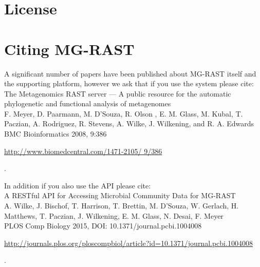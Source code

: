 \documentclass[12pt,fullpage]{report}
\begin{document}
\section{License}
\label{section:LICENSE}
{ \small

}
\section{Citing MG-RAST}
\label{section:MG-RAST-citation}

A significant number of papers have been published about MG-RAST itself and the supporting platform, however we ask that if you use the system please cite: \\
\noindent
The Metagenomics RAST server --- A public resource for the automatic phylogenetic and functional analysis of metagenomes \\
\noindent
F. Meyer, D. Paarmann, M. D'Souza, R. Olson , E. M. Glass, M. Kubal, T. Paczian, A. Rodriguez, R. Stevens, A. Wilke, J. Wilkening, and R. A. Edwards \\
\noindent
BMC Bioinformatics 2008, 9:386 \\
\noindent
\begin{small}\url{http://www.biomedcentral.com/1471-2105/ 9/386}\end{small}.

In addition if you also use the API please cite:\\
\noindent
A RESTful API for Accessing Microbial Community Data for MG-RAST\\
\noindent
  A. Wilke,   J. Bischof,  T. Harrison,  T. Brettin,   M. D'Souza,  W. Gerlach,     H. Matthews,  T. Paczian,   J. Wilkening,     E. M. Glass,    N. Desai,
    F. Meyer \\
\noindent
PLOS Comp Biology 2015, DOI: 10.1371/journal.pcbi.1004008\\
\noindent
\begin{small}\url{http://journals.plos.org/ploscompbiol/article?id=10.1371/journal.pcbi.1004008}\end{small}.



\end{document}
